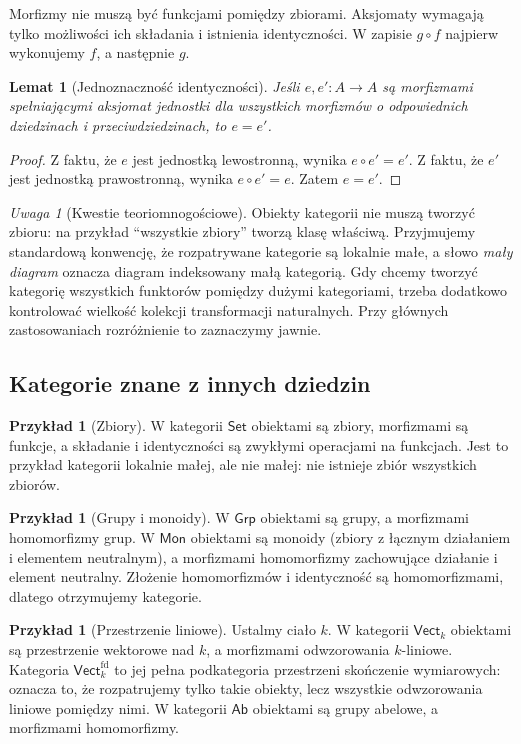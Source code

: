 \documentclass[11pt,a4paper]{article}
\numberwithin{equation}{section}
\theoremstyle{plain}
\newtheorem{lemat}[twierdzenie]{Lemat}
\theoremstyle{definition}
\newtheorem{przyklad}[twierdzenie]{Przykład}
\theoremstyle{remark}
\newtheorem{uwaga}[twierdzenie]{Uwaga}
\newcommand{\cat}[1]{\mathsf{#1}}
\newcommand{\Set}{\cat{Set}}
\newcommand{\Grp}{\cat{Grp}}
\newcommand{\Mon}{\cat{Mon}}
\newcommand{\Vect}{\cat{Vect}}
\newcommand{\Ab}{\cat{Ab}}
\begin{document}
Morfizmy nie muszą być funkcjami pomiędzy zbiorami. Aksjomaty wymagają tylko możliwości ich składania i istnienia identyczności. W zapisie $g\circ f$ najpierw wykonujemy $f$, a następnie $g$.

\begin{lemat}[Jednoznaczność identyczności]
Jeśli $e,e':A\to A$ są morfizmami spełniającymi aksjomat jednostki dla wszystkich morfizmów o odpowiednich dziedzinach i przeciwdziedzinach, to $e=e'$.
\end{lemat}
\begin{proof}
Z faktu, że $e$ jest jednostką lewostronną, wynika $e\circ e'=e'$. Z faktu, że $e'$ jest jednostką prawostronną, wynika $e\circ e'=e$. Zatem $e=e'$.
\end{proof}


\begin{uwaga}[Kwestie teoriomnogościowe]
Obiekty kategorii nie muszą tworzyć zbioru: na przykład ``wszystkie zbiory'' tworzą klasę właściwą. Przyjmujemy standardową konwencję, że rozpatrywane kategorie są lokalnie małe, a słowo \emph{mały diagram} oznacza diagram indeksowany małą kategorią. Gdy chcemy tworzyć kategorię wszystkich funktorów pomiędzy dużymi kategoriami, trzeba dodatkowo kontrolować wielkość kolekcji transformacji naturalnych. Przy głównych zastosowaniach rozróżnienie to zaznaczymy jawnie.
\end{uwaga}


\subsection{Kategorie znane z innych dziedzin}

\begin{przyklad}[Zbiory]
W kategorii $\Set$ obiektami są zbiory, morfizmami są funkcje, a składanie i identyczności są zwykłymi operacjami na funkcjach. Jest to przykład kategorii lokalnie małej, ale nie małej: nie istnieje zbiór wszystkich zbiorów.
\end{przyklad}

\begin{przyklad}[Grupy i monoidy]
W $\Grp$ obiektami są grupy, a morfizmami homomorfizmy grup. W $\Mon$ obiektami są monoidy (zbiory z łącznym działaniem i elementem neutralnym), a morfizmami homomorfizmy zachowujące działanie i element neutralny. Złożenie homomorfizmów i identyczność są homomorfizmami, dlatego otrzymujemy kategorie.
\end{przyklad}

\begin{przyklad}[Przestrzenie liniowe]
Ustalmy ciało $k$. W kategorii $\Vect_k$ obiektami są przestrzenie wektorowe nad $k$, a morfizmami odwzorowania $k$-liniowe. Kategoria $\Vect_k^{\mathrm{fd}}$ to jej pełna podkategoria przestrzeni skończenie wymiarowych: oznacza to, że rozpatrujemy tylko takie obiekty, lecz wszystkie odwzorowania liniowe pomiędzy nimi. W kategorii $\Ab$ obiektami są grupy abelowe, a morfizmami homomorfizmy.
\end{przyklad}
\end{document}
